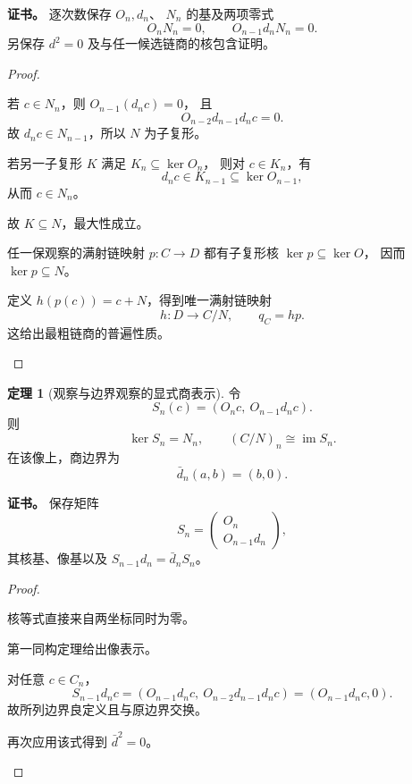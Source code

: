 \documentclass[UTF8,12pt,a4paper,openany,fontset=none,zihao=false]{ctexrep}
\theoremstyle{definition}
\newtheorem{theorem}{定理}[chapter]
\newenvironment{certificate}{\par\noindent\textbf{证书。}\ignorespaces}{\par}
\newcommand{\1}{\mathbf 1}
\begin{document}
\begin{certificate}
逐次数保存 \(O_n,d_n\)、
\(N_n\) 的基及两项零式
\[
O_nN_n=0,\qquad O_{n-1}d_nN_n=0.
\]
另保存 \(d^2=0\) 及与任一候选链商的核包含证明。
\end{certificate}
\begin{proof}
\begin{semanticsteps}
\item 若 \(c\in N_n\)，则 \(O_{n-1}(d_nc)=0\)，
且
\[
O_{n-2}d_{n-1}d_nc=0.
\]
故 \(d_nc\in N_{n-1}\)，所以 \(N\) 为子复形。
\item 若另一子复形 \(K\) 满足 \(K_n\subseteq\ker O_n\)，
则对 \(c\in K_n\)，有
\[
d_nc\in K_{n-1}\subseteq\ker O_{n-1},
\]
从而 \(c\in N_n\)。
\item 故 \(K\subseteq N\)，最大性成立。
\item 任一保观察的满射链映射 \(p:C\to D\)
都有子复形核 \(\ker p\subseteq\ker O\)，
因而 \(\ker p\subseteq N\)。
\item 定义 \(h(p(c))=c+N\)，得到唯一满射链映射
\[
h:D\to C/N,\qquad q_C=hp.
\]
这给出最粗链商的普遍性质。
\end{semanticsteps}
\end{proof}
\begin{theorem}[观察与边界观察的显式商表示]
\label{ch:explicit-image}
令
\[
S_n(c)=(O_nc,\ O_{n-1}d_nc).
\]
则
\[
\ker S_n=N_n,\qquad
(C/N)_n\cong\operatorname{im}S_n.
\]
在该像上，商边界为
\[
\bar d_n(a,b)=(b,0).
\]
\end{theorem}
\begin{certificate}
保存矩阵
\[
S_n=
\begin{pmatrix}
O_n\\ O_{n-1}d_n
\end{pmatrix},
\]
其核基、像基以及
\(S_{n-1}d_n=\bar d_nS_n\)。
\end{certificate}
\begin{proof}
\begin{semanticsteps}
\item 核等式直接来自两坐标同时为零。
\item 第一同构定理给出像表示。
\item 对任意 \(c\in C_n\)，
\[
S_{n-1}d_nc
=(O_{n-1}d_nc,\ O_{n-2}d_{n-1}d_nc)
=(O_{n-1}d_nc,0).
\]
故所列边界良定义且与原边界交换。
\item 再次应用该式得到 \(\bar d^2=0\)。
\end{semanticsteps}
\end{proof}
\end{document}
